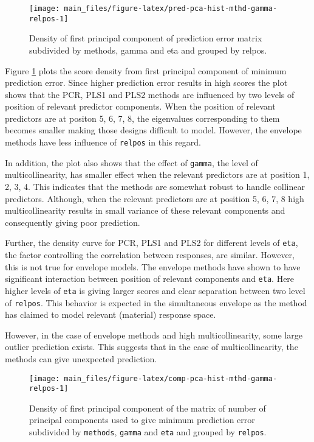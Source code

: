 \documentclass[12pt,3p,authoryear]{elsarticle}
\begin{document}
\begin{figure}[!htb]
\texttt{[image: main\_files/figure-latex/pred-pca-hist-mthd-gamma-relpos-1]} \caption{Density of first principal component of prediction error
matrix subdivided by methods, gamma and eta and grouped by relpos.}\label{fig:pred-pca-hist-mthd-gamma-relpos}
\end{figure}

Figure \ref{fig:pred-pca-hist-mthd-gamma-relpos} plots the score density
from first principal component of minimum prediction error. Since higher
prediction error results in high scores the plot shows that the PCR,
PLS1 and PLS2 methods are influenced by two levels of position of
relevant predictor components. When the position of relevant predictors
are at positon 5, 6, 7, 8, the eigenvalues corresponding to them becomes
smaller making those designs difficult to model. However, the envelope
methods have less influence of \texttt{relpos} in this regard.

In addition, the plot also shows that the effect of \texttt{gamma}, the
level of multicollinearity, has smaller effect when the relevant
predictors are at position 1, 2, 3, 4. This indicates that the methods
are somewhat robust to handle collinear predictors. Although, when the
relevant predictors are at position 5, 6, 7, 8 high multicollinearity
results in small variance of these relevant components and consequently
giving poor prediction.

Further, the density curve for PCR, PLS1 and PLS2 for different levels
of \texttt{eta}, the factor controlling the correlation between
responses, are similar. However, this is not true for envelope models.
The envelope methods have shown to have significant interaction between
position of relevant components and \texttt{eta}. Here higher levels of
\texttt{eta} is giving larger scores and clear separation between two
level of \texttt{relpos}. This behavior is expected in the simultaneous
envelope as the method has claimed to model relevant (material) response
space.

However, in the case of envelope methods and high multicollinearity,
some large outlier prediction exists. This suggests that in the case of
multicollinearity, the methods can give unexpected prediction.






\begin{figure}[!htb]
\texttt{[image: main\_files/figure-latex/comp-pca-hist-mthd-gamma-relpos-1]} \caption{Density of first principal component of the matrix of
number of principal components used to give minimum prediction error
subdivided by \texttt{methods}, \texttt{gamma} and \texttt{eta} and
grouped by \texttt{relpos}.}\label{fig:comp-pca-hist-mthd-gamma-relpos}
\end{figure}
\end{document}
